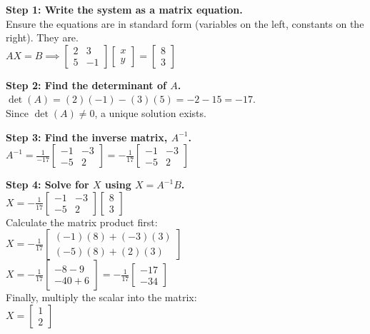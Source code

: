 \begin{solution}
\textbf{Step 1: Write the system as a matrix equation.} \\
Ensure the equations are in standard form (variables on the left, constants on the right). They are. \\
$AX = B \implies \begin{bmatrix} 2 & 3 \\ 5 & -1 \end{bmatrix} \begin{bmatrix} x \\ y \end{bmatrix} = \begin{bmatrix} 8 \\ 3 \end{bmatrix}$

\medskip
\textbf{Step 2: Find the determinant of $A$.} \\
$\det(A) = (2)(-1) - (3)(5) = -2 - 15 = -17$. \\
Since $\det(A) \neq 0$, a unique solution exists.

\medskip
\textbf{Step 3: Find the inverse matrix, $A^{-1}$.} \\
$A^{-1} = \frac{1}{-17} \begin{bmatrix} -1 & -3 \\ -5 & 2 \end{bmatrix} = -\frac{1}{17} \begin{bmatrix} -1 & -3 \\ -5 & 2 \end{bmatrix}$

\medskip
\textbf{Step 4: Solve for $X$ using $X = A^{-1}B$.} \\
$X = -\frac{1}{17} \begin{bmatrix} -1 & -3 \\ -5 & 2 \end{bmatrix} \begin{bmatrix} 8 \\ 3 \end{bmatrix}$ \\[6pt]
Calculate the matrix product first: \\
$X = -\frac{1}{17} \begin{bmatrix} (-1)(8) + (-3)(3) \\ (-5)(8) + (2)(3) \end{bmatrix}$ \\[6pt]
$X = -\frac{1}{17} \begin{bmatrix} -8 - 9 \\ -40 + 6 \end{bmatrix} = -\frac{1}{17} \begin{bmatrix} -17 \\ -34 \end{bmatrix}$ \\[6pt]
Finally, multiply the scalar into the matrix: \\
$X = \begin{bmatrix} 1 \\ 2 \end{bmatrix}$


\end{solution}
